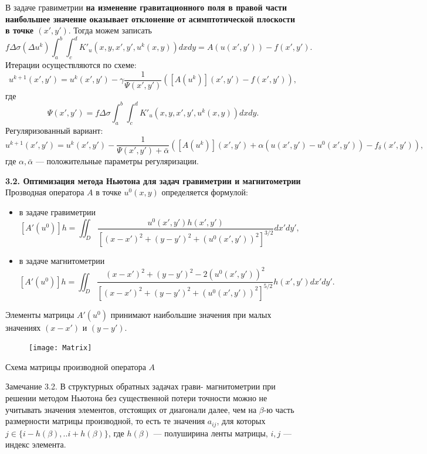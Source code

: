 \documentclass[10pt,pdf, mathserif, hyperref={unicode}]{beamer}
\begin{document}
\begin{frame}{}
	В задаче гравиметрии {\textbf{\color{blue}на изменение гравитационного поля в правой части наибольшее значение оказывает отклонение от асимптотической плоскости в точке $(x',y')$}}. Тогда можем записать
	$$f\Delta\sigma(\Delta u^k)\int_{a}^{b}\int_{c}^{d}K'_u(x,y, x',y',u^k(x,y)) dxdy=A(u(x',y'))-f(x',y').$$
	Итерации осуществляются по схеме:
	$$u^{k+1}(x',y')=u^k(x',y')-\gamma\frac{1}{\varPsi(x',y')}([A(u^k)](x',y')-f(x',y')),$$
	где $$\varPsi(x',y')=f\Delta\sigma\int_{a}^{b}\int_{c}^{d}K'_u(x,y, x',y',u^k(x,y)) dxdy.$$
	Регуляризованный вариант:
	$$u^{k+1}(x',y')=u^k(x',y')-\frac{1}{\varPsi(x',y')+\bar{\alpha}}([A(u^k)](x',y')+\alpha (u(x',y')-u^0(x',y'))-f_\delta(x',y')),$$
	где $\alpha, \bar{\alpha}$ --- положительные параметры регуляризации.
	\let\thefootnote\relax\let\thefootnote\relax{}
\end{frame}

\begin{frame}{\small\textbf{3.2. Оптимизация метода Ньютона для задач гравиметрии и магнитометрии}}
	Прозводная оператора $A$ в точке $u^0(x,y)$ определяется формулой:
	\begin{itemize}
		\item в задаче гравиметрии
		$$ [A'(u^0)]h=\iint_{D} \frac{u^0(x',y')h(x',y')}{[(x-x')^2+(y-y')^2+(u^0(x',y'))^2]^{3/2}}dx'dy',$$
		\item в задаче магнитометрии
		$$ [A'(u^0)]h=\iint_{D} \frac{(x-x')^2+(y-y')^2-2(u^0(x',y'))^2}{[(x-x')^2+(y-y')^2+(u^0(x',y'))^2]^{5/2}}h(x',y')dx'dy'.$$
	\end{itemize}

Элементы матрицы $A'(u^0)$ принимают наибольшие значения при малых значениях $(x-x')$ и $(y-y')$.
\begin{figure}
	\texttt{[image: Matrix]}
\end{figure}
\centering \scriptsize Схема матрицы производной оператора $A$
\end{frame}

\begin{frame}
	\begin{block}{Замечание 3.2.}
		В структурных обратных задачах грави- магнитометрии при решении методом Ньютона без существенной потери точности можно не учитывать значения элементов, отстоящих от диагонали далее, чем на  $\beta$-ю часть  размерности матрицы производной, то есть те значения $a_{ij}$, для которых  $j \in \{i-h(\beta),..i+h(\beta)\} $, где $h(\beta)$ --- полуширина ленты матрицы, $i, j$ --- индекс элемента.
	\end{block}
	\let\thefootnote\relax\let\thefootnote\relax{}
\end{frame}
\end{document}
